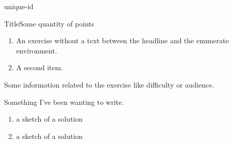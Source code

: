 {unique-id}
{
\begin{exercise}{Title}{Some quantity of points}
\neuezeile
\begin{enumerate}
	\item An exercise without a text between the headline and the enumerate environment.
	\item A second item.
\end{enumerate}

\begin{infos}
Some information related to the exercise like difficulty or audience.
\end{infos}

\begin{material}
Something I've been wanting to write.
\end{material}

\begin{sketch}
\begin{enumerate}
	\item a sketch of a solution
	\item a sketch of a solution
\end{enumerate}
\end{sketch}

\end{exercise}
}

